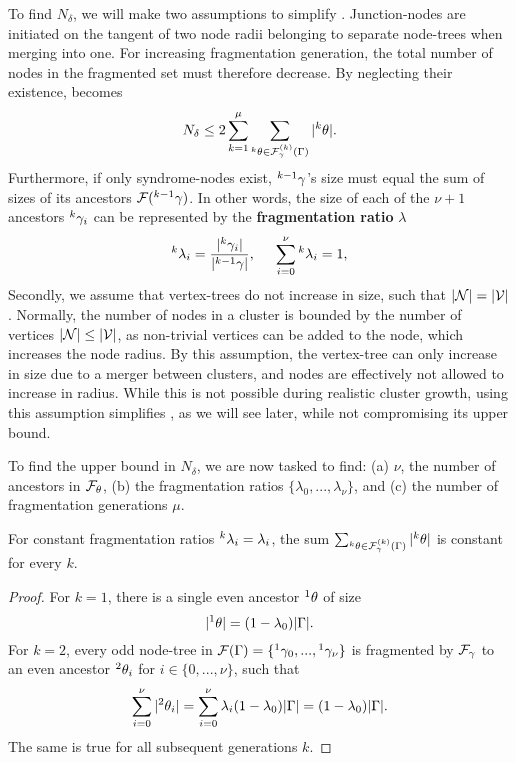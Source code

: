 To find $N_\delta$, we will make two assumptions to simplify . Junction-nodes are initiated on the tangent of two node radii belonging to separate node-trees when merging into one. For increasing fragmentation generation, the total number of nodes in the fragmented set must therefore decrease. By neglecting their existence,  becomes
\begin{equation}\label{eq:npdc2}
  N_\delta \leq 2\sum_{k=1}^\mu{ \sum_{  {}^{k} \theta \in \mathcal{F}_\gamma^{(k)}(\Gamma) }{ \lvert {}^{k} \theta\rvert} }.
\end{equation}
Furthermore, if only syndrome-nodes exist, ${}^{k-1}\gamma$'s size must equal the sum of sizes of its ancestors $\mathcal{F}({}^{k-1}\gamma)$. In other words, the size of each of the $\nu+1$ ancestors ${}^{k}\gamma_i$ can be represented by the \textbf{fragmentation ratio} $\lambda$
\begin{equation}\label{eq:ratio}
  {}^{k}\lambda_i = \frac{\lvert{}^{k}\gamma_i\rvert}{\lvert{}^{k-1}\gamma\rvert}, \hspace{0.5cm} \sum_{i=0}^{\nu}{{}^{k}\lambda_i} = 1,
\end{equation}
Secondly, we assume that vertex-trees do not increase in size, such that $\lvert\mathcal{N}\rvert=\lvert\mathcal{V}\rvert$. Normally, the number of nodes in a cluster is bounded by the number of vertices $\lvert\mathcal{N}\rvert\leq \lvert\mathcal{V}\rvert$, as non-trivial vertices can be added to the node, which increases the node radius. By this assumption, the vertex-tree can only increase in size due to a merger between clusters, and nodes are effectively not allowed to increase in radius. While this is not possible during realistic cluster growth, using this assumption simplifies , as we will see later, while not compromising its upper bound. 

To find the upper bound in $N_\delta$, we are now tasked to find: (a) $\nu$, the number of ancestors in $\mathcal{F}_\theta$, (b) the fragmentation ratios $\{\lambda_0, ..., \lambda_\nu\}$, and (c) the number of fragmentation generations $\mu$. 

\begin{lemma}\label{lem:evenconstant}
  For constant fragmentation ratios ${}^{k}\lambda_i = \lambda_i$, the sum $\sum_{ {}^{k}\theta \in \mathcal{F}_\gamma^{(k)}(\Gamma) }{ \lvert{}^{k}\theta\rvert}$ is constant for every $k$. 
\end{lemma}
\begin{proof}
  For $k=1$, there is a single even ancestor ${}^{1}\theta$ of size 
  \begin{equation*}
    \lvert{}^{1}\theta\rvert = (1 - \lambda_0)\lvert\Gamma\rvert.
  \end{equation*}
  For $k=2$, every odd node-tree in $\mathcal{F}(\Gamma)=\{{}^{1}\gamma_0,...,{}^{1}\gamma_\nu\}$ is fragmented by $\mathcal{F}_\gamma$ to an even ancestor ${}^{2}\theta_i$ for $i \in \{0,...,\nu \}$, such that 
  \begin{equation*}
    \sum_{i=0}^{\nu}{\lvert{}^{2}\theta_i\rvert}  = \sum_{i=0}^{\nu}{\lambda_i(1 - \lambda_0)\lvert\Gamma\rvert}= (1 - \lambda_0)\lvert\Gamma\rvert.
  \end{equation*}
  The same is true for all subsequent generations $k$. 
\end{proof}

